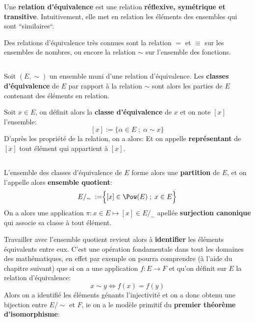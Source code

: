 Une \textbf{relation d'équivalence} est une relation \textbf{réflexive, symétrique et transitive}. Intuitivement, elle met en relation les éléments des ensembles qui sont ``similaires``.\<

Des relations d'équivalence très connues sont la relation \(=\) et \(\equiv\) sur les ensembles de nombres, ou encore la relation \(\sim\) sur l'ensemble des fonctions.
\subsection*{}

Soit \((E, \sim)\) un ensemble muni d'une relation d'équivalence.\+
Les \textbf{classes d'équivalence} de \(E\) par rapport à la relation \(\sim\) sont alors les parties de \(E\) contenant des éléments en relation.\<

Soit \(x \in E\), on définit alors la \textbf{classe d'équivalence} de \(x\) et on note \([x]\) l'ensemble:
\[
    [x] := \Bigr\{ \alpha \in E \; ; \; \alpha \sim x \Bigr\}
\]
D'après les propriété de la relation, on a alors:
Et on appelle \textbf{représentant} de \([x]\) tout élément qui appartient à \([x]\).
\subsection*{}

L'ensemble des classes d'équivalence de \(E\) forme alors une \textbf{partition} de \(E\), et on l'appelle alors \textbf{ensemble quotient}:
\[
    E /_\sim \; := \Bigr\{ [x] \in \Pow(E) \; ; \; x \in E \Bigr\}
\]
On a alors une application \( \pi : x \in E \longmapsto [x] \in E /_\sim \) apellée \textbf{surjection canonique} qui associe sa classe à tout élément.\<

Travailler avec l'ensemble quotient revient alors à \textbf{identifier} les éléments équivalents entre eux. C'est une opération fondamentale dans tout les domaines des mathématiques, en effet par exemple on pourra comprendre (à l'aide du chapitre suivant) que si on a une application \( f : E \longrightarrow F \) et qu'on définit sur \( E \) la relation d'équivalence: 
\[ 
   x \sim y \iff f(x) = f(y)
\]
Alors on a identifié les éléments génants l'injectivité et on a donc obtenu une bijection entre \( E / \sim \) et \( F \), ie on a le modèle primitif du \textbf{premier théorème d'isomorphisme}:
\begin{center}
\end{center}

